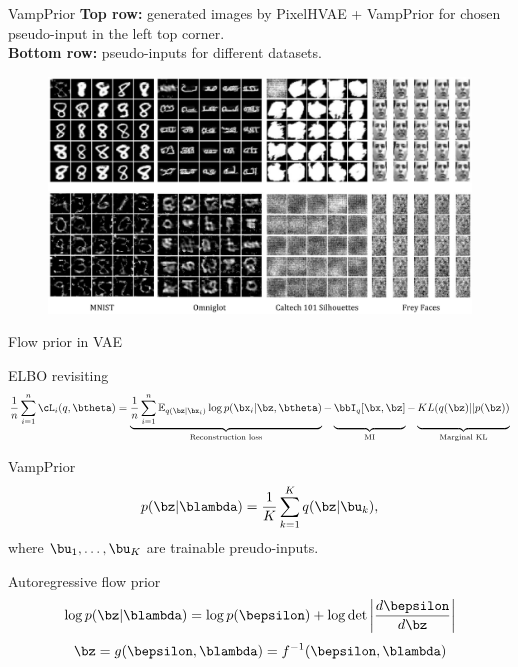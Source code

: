 \begin{frame}{VampPrior}
	\vspace{0.1cm}
	\textbf{Top row:} generated images by PixelHVAE + VampPrior for chosen pseudo-input in the left top corner. \\
	\vspace{0.1cm}
	\textbf{Bottom row:} pseudo-inputs for different datasets.
	\begin{figure}[h]
		\centering
		\includegraphics[width=1.0\linewidth]{figs/VampPrior_4.png}
	\end{figure}
\end{frame}
\begin{frame}{Flow prior in VAE}
	
	\begin{block}{ELBO revisiting}
		\vspace{-0.4cm}
		\[
		    \frac{1}{n} \sum_{i=1}^n \cL_i(q, \btheta) = \underbrace{\frac{1}{n} \sum_{i=1}^n \mathbb{E}_{q(\bz | \bx_i)} \log p(\bx_i | \bz, \btheta)}_{\text{Reconstruction loss}}
	- \underbrace{\vphantom{ \sum_{i=1}^n} \bbI_q [\bx, \bz]}_{\text{MI}} - \underbrace{\vphantom{ \sum_{i=1}^n} KL(q(\bz) || p(\bz))}_{\text{Marginal KL}}
		\]
	\end{block}
	\vspace{-0.5cm}
	\begin{block}{VampPrior}
		\vspace{-0.5cm}
		\[
			p(\bz | \blambda) = \frac{1}{K} \sum_{k=1}^K q(\bz | \bu_k),
		\]
	where $\bu_1, \dots, \bu_K$ are trainable preudo-inputs.
	\end{block}
	\begin{block}{Autoregressive flow prior}
		\vspace{-0.3cm}
		\[
			\log p(\bz | \blambda) = \log p(\bepsilon) + \log \det \left | \frac{d \bepsilon}{d\bz}\right|
		\]
		\[
			\bz = g(\bepsilon, \blambda) = f^{-1}(\bepsilon, \blambda)
		\]
	\end{block}
\end{frame}
